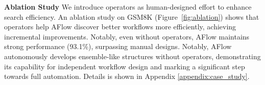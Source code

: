 \documentclass{article} %
\newcommand{\model}{{\sc AFlow}\xspace}
\theoremstyle{plain}
\theoremstyle{definition}
\theoremstyle{remark}
\begin{document}
\noindent\textbf{Ablation Study}
\label{sec:ablation}
We introduce operators as human-designed effort to enhance search efficiency. An ablation study on GSM8K (Figure~\ref{fig:ablation}) shows that operators help \model discover better workflows more efficiently, achieving incremental improvements. Notably, even without operators, \model maintains strong performance (93.1\%), surpassing manual designs. Notably, \model autonomously develops ensemble-like structures without operators, demonstrating its capability for independent workflow design and marking a significant step towards full automation. Details is shown in Appendix \ref{appendix:case_study}.



\end{document}
